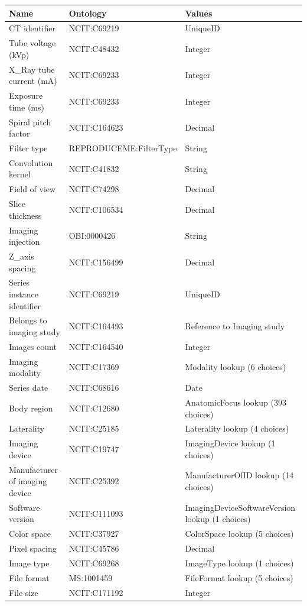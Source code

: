 \documentclass{article}
\begin{document}
\begin{table}[htb]
\begin{tabular}{lll}
Name & Ontology & Values \\
\hline
CT identifier & NCIT:C69219 & UniqueID \\
Tube voltage (kVp) & NCIT:C48432 & Integer \\
X_Ray tube current (mA) & NCIT:C69233 & Integer \\
Exposure time (ms) & NCIT:C69233 & Integer \\
Spiral pitch factor & NCIT:C164623 & Decimal \\
Filter type & REPRODUCEME:FilterType & String \\
Convolution kernel & NCIT:C41832 & String \\
Field of view & NCIT:C74298 & Decimal \\
Slice thickness & NCIT:C106534 & Decimal \\
Imaging injection & OBI:0000426 & String \\
Z_axis spacing & NCIT:C156499 & Decimal \\
Series instance identifier & NCIT:C69219 & UniqueID \\
Belongs to imaging study & NCIT:C164493 & Reference to Imaging study \\
Images count & NCIT:C164540 & Integer \\
Imaging modality & NCIT:C17369 & Modality lookup (6 choices) \\
Series date & NCIT:C68616 & Date \\
Body region & NCIT:C12680 & AnatomicFocus lookup (393 choices) \\
Laterality & NCIT:C25185 & Laterality lookup (4 choices) \\
Imaging device & NCIT:C19747 & ImagingDevice lookup (1 choices) \\
Manufacturer of imaging device & NCIT:C25392 & ManufacturerOfID lookup (14 choices) \\
Software version & NCIT:C111093 & ImagingDeviceSoftwareVersion lookup (1 choices) \\
Color space & NCIT:C37927 & ColorSpace lookup (5 choices) \\
Pixel spacing & NCIT:C45786 & Decimal \\
Image type & NCIT:C69268 & ImageType lookup (1 choices) \\
File format & MS:1001459 & FileFormat lookup (5 choices) \\
File size & NCIT:C171192 & Integer \\

\end{tabular}
\end{table}
\end{document}
